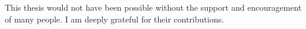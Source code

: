 \documentclass{kmou_thesis}
\begin{document}
\backmatter



\begin{acknowledgments}
This thesis would not have been possible without the support and encouragement of many people.  
I am deeply grateful for their contributions.  
\end{acknowledgments}
\end{document}
